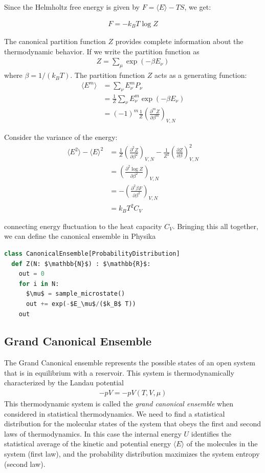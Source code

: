 \documentclass[book.tex]{subfiles}
\begin{document}
Since the Helmholtz free energy is given by $F = \langle E \rangle - TS$, we get:

\begin{align}
F = -k_BT\log Z
\end{align}

The canonical partition function $Z$ provides complete information
about the thermodynamic behavior. If we write the partition function as 
\begin{align}
Z = \sum_\mu \exp\left(-\beta E_\nu\right)
\end{align} 
where $\beta = 1/\left(k_BT\right)$. The partition function $Z$ acts as a generating function:
\begin{align}
\langle E^m \rangle &= \sum_\nu E_\nu^m P_\nu \\
&= \frac{1}{Z}\sum_\nu E^m_\nu \exp\left(-\beta E_\nu \right) \\
&= \left(-1\right)^m \frac{1}{Z} \left(\frac{\partial^m Z}{\partial \beta^m}\right)_{V,N} 
\end{align}

Consider the variance of the energy:
\begin{align}
\langle E^2 \rangle - {\langle E \rangle}^2 &= \frac{1}{Z} \left(\frac{\partial^2 Z}{\partial \beta^2}\right)_{V,N} - \frac{1}{Z^2} \left(\frac{\partial Z}{\partial \beta}\right)_{V,N}^2 \\
&= \left(\frac{\partial^2 \log Z}{\partial \beta^2}\right)_{V,N} \\
&= -\left(\frac{\partial^2 \beta F}{\partial \beta^2}\right)_{V,N} \\
&= k_B T^2 C_V 
\end{align}

\noindent connecting energy fluctuation to the heat capacity $C_V$. Bringing this all together, we can define the canonical ensemble in Physika

\begin{lstlisting}[language=python]
class CanonicalEnsemble[ProbabilityDistribution]
  def Z(N: $\mathbb{N}$) : $\mathbb{R}$:
    out = 0
    for i in N:
      $\mu$ = sample_microstate()
      out += exp(-$E_\mu$/($k_B$ T))
    out
\end{lstlisting}

\subsection{Grand Canonical Ensemble}
The Grand Canonical ensemble represents the possible states of an open system that is in equilibrium with a reservoir. This system is thermodynamically characterized by the Landau potential 
\begin{align}
-pV = -pV(T,V,\mu)
\end{align}
This thermodynamic system is called the \textit{grand canonical ensemble} when considered in statistical thermodynamics. 
We need to find a statistical distribution for the molecular states of the system
that obeys the first and second laws of thermodynamics. In this case the internal energy $U$ identifies the statistical average of the kinetic and potential energy $\langle E\rangle$ of the molecules in the system (first law), and the probability distribution maximizes the system entropy (second law).
\end{document}
